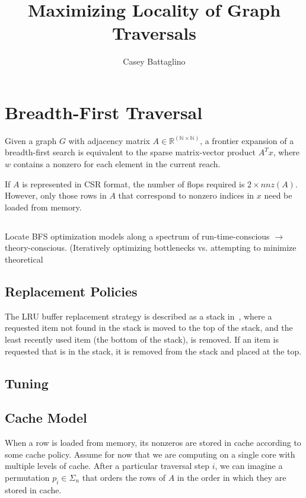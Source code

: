 \documentclass[11pt]{article}
\title{Maximizing Locality of Graph Traversals}
\author{Casey Battaglino}
\date{}
\begin{document}
\maketitle

\section{Breadth-First Traversal}

Given a graph $G$ with adjacency matrix $A \in \mathbb{R^{(N \times N)}}$, a frontier expansion of a breadth-first search is equivalent to the sparse matrix-vector product $A^Tx$, where $w$ contains a nonzero for each element in the current reach. 

If $A$ is represented in CSR format, the number of flops required is $2 \times nnz(A)$. However, only those rows in $A$ that correspond to nonzero indices in $x$ need be loaded from memory. 

\subsection{}
Locate BFS optimization models along a spectrum of run-time-conscious $\to$ theory-conscious. (Iteratively optimizing bottlenecks vs. attempting to minimize theoretical 

\subsection{Replacement Policies}
The LRU buffer replacement strategy is described as a stack in~\cite{Dan:1990:AAL:98457.98525}, where a requested item not found in the stack is moved to the top of the stack, and the least recently used item (the bottom of the stack), is removed. If an item is requested that is in the stack, it is removed from the stack and placed at the top. 

\subsection{Tuning}
\cite{Xia_topologicallyadaptive}

\subsection{Cache Model}
When a row is loaded from memory, its nonzeros are stored in cache according to some cache policy. Assume for now that we are computing on a single core with multiple levels of cache. After a particular traversal step $i$, we can imagine a permutation $p_i \in \Sigma_n$ that orders the rows of $A$ in the order in which they are stored in cache. 
\end{document}
